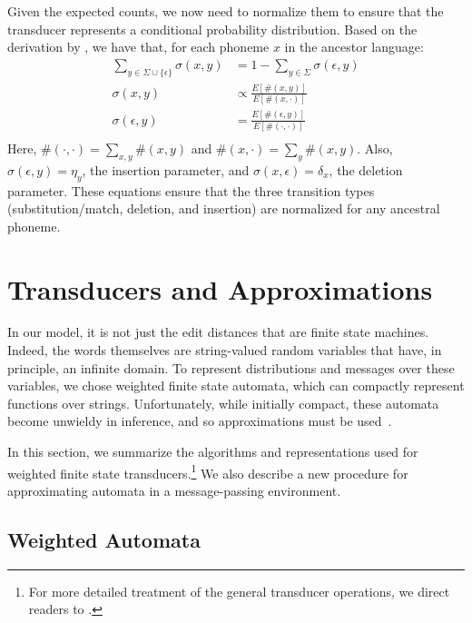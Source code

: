 \documentclass[11pt,a4paper]{article}
\begin{document}
Given the expected counts, we now need to normalize them to ensure
that the transducer represents a conditional probability distribution.
Based on the derivation by , we have that,
for each phoneme $x$ in the ancestor language:
\begin{equation*}
  \begin{split}
    \sum_{y \in \Sigma \cup \{\epsilon\}} \sigma(x,y) &= 1 - \sum_{y \in \Sigma} \sigma(\epsilon,y) \\
    \sigma(x,y) &\propto \frac{E[\#(x,y)]}{E[\#(x,\cdot)]} \\
    \sigma(\epsilon,y) &= \frac{E[\#(\epsilon,y)]}{E[\#(\cdot,\cdot)]} \\
   \end{split}
 \end{equation*}
Here, $\#(\cdot,\cdot) = \sum_{x,y} \#(x,y)$ and $\#(x,\cdot)=\sum_y
\#(x,y)$. Also, $\sigma(\epsilon,y) = \eta_y$, the insertion
parameter, and $\sigma(x,\epsilon) = \delta_x$, the deletion
parameter.  These equations ensure that the three transition types
(substitution/match, deletion, and insertion) are normalized for
any ancestral phoneme.

\section{Transducers and Approximations}

In our model, it is not just the edit distances that are finite
state machines. Indeed, the words themselves are string-valued
random variables that have, in principle, an infinite domain. To
represent distributions and messages over these variables, we chose
weighted finite state automata, which can compactly represent
functions over strings. Unfortunately, while initially compact,
these automata become unwieldy in inference, and so approximations
must be used~\cite{dreyer2009graphical}.

In this section, we summarize the algorithms and representations
used for weighted finite state transducers.\footnote{For more
detailed treatment of the general transducer operations, we direct
readers to .} We also describe a new
procedure for approximating automata in a message-passing environment.

\subsection{Weighted Automata}
\end{document}
